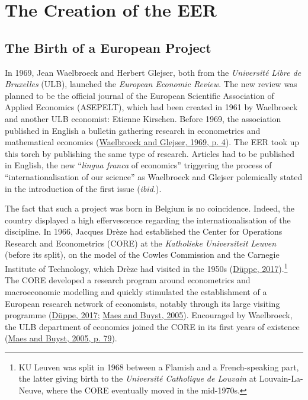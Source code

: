 \documentclass[]{elsarticle} %
\begin{document}
\hypertarget{EER-creation}{%
\section{The Creation of the EER}\label{EER-creation}}

\hypertarget{the-birth-of-a-european-project}{%
\subsection{The Birth of a European
Project}\label{the-birth-of-a-european-project}}

In 1969, Jean Waelbroeck and Herbert Glejser, both from the
\emph{Université Libre de Bruxelles} (ULB), launched the \emph{European
Economic Review}. The new review was planned to be the official journal
of the European Scientific Association of Applied Economics (ASEPELT),
which had been created in 1961 by Waelbroeck and another ULB economist:
Etienne Kirschen. Before 1969, the association published in English a
bulletin gathering research in econometrics and mathematical economics
(\protect\hyperlink{ref-waelbroeck1969}{Waelbroeck and Glejser, 1969, p.
4}). The EER took up this torch by publishing the same type of research.
Articles had to be published in English, the new ``\emph{lingua franca}
of economics'' triggering the process of ``internationalisation of our
science'' as Waelbroeck and Glejser polemically stated in the
introduction of the first issue (\emph{ibid.}).

The fact that such a project was born in Belgium is no coincidence.
Indeed, the country displayed a high effervescence regarding the
internationalisation of the discipline. In 1966, Jacques Drèze had
established the Center for Operations Research and Econometrics (CORE)
at the \emph{Katholieke Universiteit Leuven} (before its split), on the
model of the Cowles Commission and the Carnegie Institute of Technology,
which Drèze had visited in the 1950s
(\protect\hyperlink{ref-duppe2017}{Düppe, 2017}).\footnote{KU Leuven was
  split in 1968 between a Flamish and a French-speaking part, the latter
  giving birth to the \emph{Université Catholique de Louvain} at
  Louvain-La-Neuve, where the CORE eventually moved in the mid-1970s.}
The CORE developed a research program around econometrics and
macroeconomic modelling and quickly stimulated the establishment of a
European research network of economists, notably through its large
visiting programme (\protect\hyperlink{ref-duppe2017}{Düppe, 2017};
\protect\hyperlink{ref-maes2005}{Maes and Buyst, 2005}). Encouraged by
Waelbroeck, the ULB department of economics joined the CORE in its first
years of existence (\protect\hyperlink{ref-maes2005}{Maes and Buyst,
2005, p. 79}).
\end{document}
